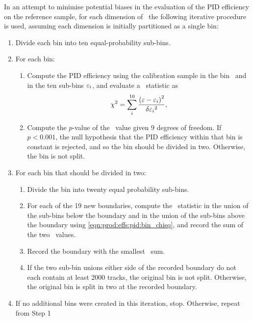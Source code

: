 In an attempt to minimise potential biases in the evaluation of the \ac{PID} 
efficiency on the reference sample, for each dimension of \ptotetanspd\ the 
following iterative procedure is used, assuming each dimension is initially 
partitioned as a single bin:
\begin{enumerate}
  \item Divide each bin into ten equal-probability sub-bins.
  \item For each bin:
    \begin{enumerate}
      \item Compute the \ac{PID} efficiency using the calibration sample in the 
        bin \eff\ and in the ten sub-bins $\varepsilon_{i}$, and evaluate a \chisq\ 
        statistic as
        \begin{equation}
          \chi^2 = \sum_{i}^{10} \frac{{(\varepsilon - \varepsilon_{i})}^{2}}{\delta{\ensuremath{\varepsilon}_{i}}^{2}},
          \label{eqn:prod:effs:pid:bin_chisq}
        \end{equation}
      \item Compute the $p$-value of the \chisq\ value given 9 degrees of 
        freedom. If $p < 0.001$, the null hypothesis that the \ac{PID} 
        efficiency within that bin is constant is rejected, and so the bin 
        should be divided in two. Otherwise, the bin is not split.
    \end{enumerate}
  \item For each bin that should be divided in two:
    \begin{enumerate}
      \item Divide the bin into twenty equal probability sub-bins.
      \item For each of the 19 new boundaries, compute the \chisq\ statistic in 
        the union of the sub-bins below the boundary and in the union of the 
        sub-bins above the boundary using \cref{eqn:prod:effs:pid:bin_chisq}, 
        and record the sum of the two \chisq\ values.
      \item Record the boundary with the smallest \chisq\ sum.
      \item If the two sub-bin unions either side of the recorded boundary do 
        not each contain at least 2000 tracks, the original bin is not split.
        Otherwise, the original bin is split in two at the recorded boundary.
    \end{enumerate}
  \item If no additional bins were created in this iteration, stop.  Otherwise, 
    repeat from Step 1
\end{enumerate}
